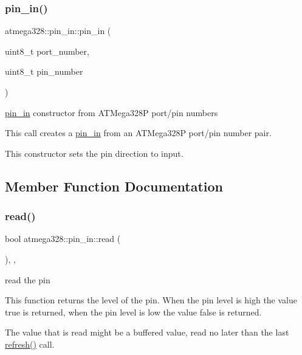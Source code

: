 \subsubsection{\texorpdfstring{pin\+\_\+in()}{pin\_in()}}
{\footnotesize\ttfamily atmega328\+::pin\+\_\+in\+::pin\+\_\+in (\begin{DoxyParamCaption}\item[{uint8\+\_\+t}]{port\+\_\+number,  }\item[{uint8\+\_\+t}]{pin\+\_\+number }\end{DoxyParamCaption})\hspace{0.3cm}{\ttfamily [inline]}}

\hyperlink{classatmega328_1_1pin__in}{pin\+\_\+in} constructor from A\+T\+Mega328P port/pin numbers

This call creates a \hyperlink{classatmega328_1_1pin__in}{pin\+\_\+in} from an A\+T\+Mega328P port/pin number pair.

This constructor sets the pin direction to input. 

\subsection{Member Function Documentation}
\mbox{\label{classatmega328_1_1pin__in_a77953ce4da1daee0511822ebae5f80e9}} 
\subsubsection{\texorpdfstring{read()}{read()}}
{\footnotesize\ttfamily bool atmega328\+::pin\+\_\+in\+::read (\begin{DoxyParamCaption}{ }\end{DoxyParamCaption})\hspace{0.3cm}{\ttfamily [inline]}, {\ttfamily [override]}, {\ttfamily [virtual]}}





read the pin

This function returns the level of the pin. When the pin level is high the value true is returned, when the pin level is low the value false is returned.

The value that is read might be a buffered value, read no later than the last \hyperlink{classatmega328_1_1pin__in_a5582f55d2e2d857e941002a7c16cea8f}{refresh()} call. 


